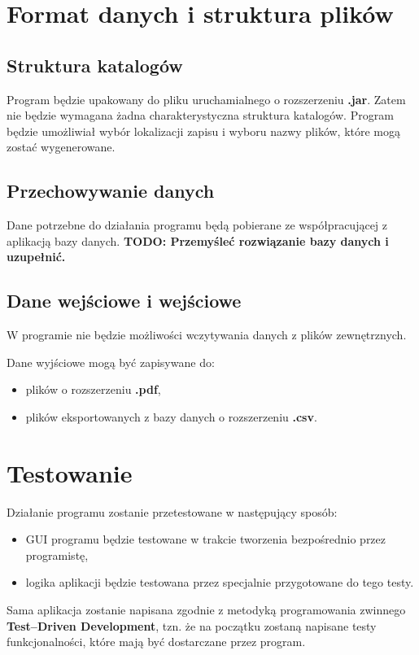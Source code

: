 \section{Format danych i struktura plików}
\subsection{Struktura katalogów}
Program będzie upakowany do pliku uruchamialnego o rozszerzeniu \textbf{.jar}. Zatem nie będzie wymagana żadna charakterystyczna struktura katalogów. Program będzie umożliwiał wybór lokalizacji zapisu i wyboru nazwy plików, które mogą zostać wygenerowane. 

\subsection{Przechowywanie danych}
Dane potrzebne do działania programu będą pobierane ze współpracującej z aplikacją bazy danych. \textbf{TODO: Przemyśleć rozwiązanie bazy danych i uzupełnić.} 

\subsection{Dane wejściowe i wejściowe}
W programie nie będzie możliwości wczytywania danych z plików zewnętrznych. 

Dane wyjściowe mogą być zapisywane do:
\begin{itemize}
\item plików o rozszerzeniu \textbf{.pdf},
\item plików eksportowanych z bazy danych o rozszerzeniu \textbf{.csv}.
\end{itemize}

\section{Testowanie}
Działanie programu zostanie przetestowane w następujący sposób:
\begin{itemize}
\item GUI programu będzie testowane w trakcie tworzenia bezpośrednio przez programistę,
\item logika aplikacji będzie testowana przez specjalnie przygotowane do tego testy.
\end{itemize}
Sama aplikacja zostanie napisana zgodnie z metodyką programowania zwinnego \textbf{Test--Driven Development}, tzn. że na początku zostaną napisane testy funkcjonalności, które mają być dostarczane przez program. 